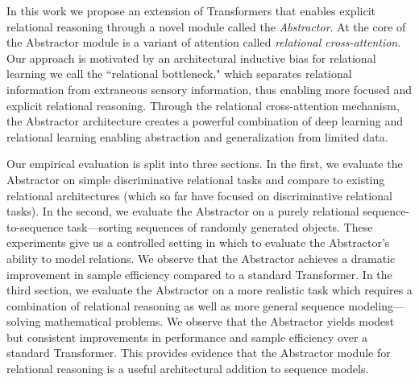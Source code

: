 In this work we propose an extension of Transformers that enables explicit relational reasoning through a novel module called the \textit{Abstractor}.
At the core of the Abstractor module is a variant of attention called \textit{relational cross-attention}.
Our approach is motivated by an architectural inductive bias for relational learning we call the
``relational bottleneck," 
which separates relational information from extraneous sensory information, thus enabling more focused and explicit relational reasoning.
Through the relational cross-attention mechanism, the Abstractor architecture
creates a powerful combination of deep learning and relational learning
enabling abstraction and generalization from limited data.

Our empirical evaluation is split into three sections. In the first, we evaluate the Abstractor on simple discriminative relational tasks and compare to existing relational architectures (which so far have focused on discriminative relational tasks).
In the second, we evaluate the Abstractor on a purely relational sequence-to-sequence task---sorting sequences of randomly generated objects. These experiments give us a controlled setting in which to evaluate the Abstractor's ability to model relations. We observe that the Abstractor achieves a dramatic improvement in sample efficiency compared to a standard Transformer.
In the third section, we evaluate the Abstractor on a more realistic task which requires a combination of relational reasoning as well as more general sequence modeling---solving mathematical problems. We observe that the Abstractor yields modest but consistent improvements in performance and sample efficiency over a standard Transformer. This provides evidence that the Abstractor module for relational reasoning is a useful architectural addition to sequence models.

